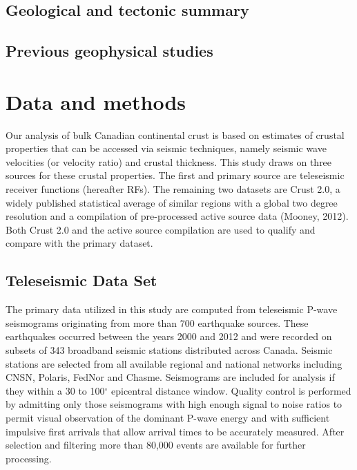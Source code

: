 \documentclass[draft, 12pt]{article}
\begin{document}
\subsection{Geological and tectonic summary}


\subsection{Previous geophysical studies}

\section{Data and methods}
Our analysis of bulk Canadian continental crust is based on estimates of crustal properties that can be accessed via seismic techniques, namely seismic wave velocities (or velocity ratio) and crustal thickness. This study draws on three sources for these crustal properties. The first and primary source are teleseismic receiver functions (hereafter RFs). The remaining two datasets are Crust 2.0, a widely published statistical average of similar regions with a global two degree resolution and a compilation of pre-processed active source data (Mooney, 2012). Both Crust 2.0 and the active source compilation are used to qualify and compare with the primary dataset.

\subsection{Teleseismic Data Set}
The primary data utilized in this study are computed from teleseismic P-wave seismograms originating from more than 700 earthquake sources. These earthquakes occurred between the years 2000 and 2012 and were recorded on subsets of 343 broadband seismic stations distributed across Canada. Seismic stations are selected from all available regional and national networks including CNSN, Polaris, FedNor and Chasme. Seismograms are included for analysis if they within a 30 to 100$^\circ$ epicentral distance window. Quality control is performed by admitting only those seismograms with high enough signal to noise ratios to permit visual observation of the dominant P-wave energy and with sufficient impulsive first arrivals that allow arrival times to be accurately measured. After selection and filtering more than 80,000 events are available for further processing.
\end{document}
